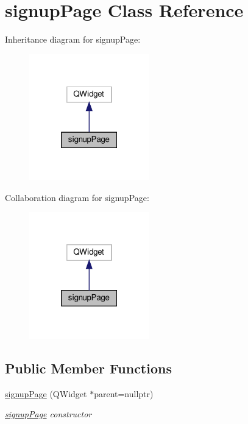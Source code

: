 \hypertarget{classsignupPage}{}\section{signup\+Page Class Reference}
\label{classsignupPage}


Inheritance diagram for signup\+Page\+:
\nopagebreak
\begin{figure}[H]
\begin{center}
\leavevmode
\includegraphics[width=148pt]{classsignupPage__inherit__graph}
\end{center}
\end{figure}


Collaboration diagram for signup\+Page\+:
\nopagebreak
\begin{figure}[H]
\begin{center}
\leavevmode
\includegraphics[width=148pt]{classsignupPage__coll__graph}
\end{center}
\end{figure}
\subsection*{Public Member Functions}
\begin{DoxyCompactItemize}
\item 
\hyperlink{classsignupPage_a98bc63ddaba1db86306d469223dc4c59}{signup\+Page} (Q\+Widget $\ast$parent=nullptr)
\begin{DoxyCompactList}\small\item\em \hyperlink{classsignupPage}{signup\+Page} constructor \end{DoxyCompactList}\end{DoxyCompactItemize}



